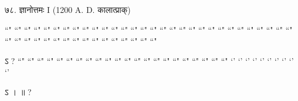 ७८. ज्ञानोत्तमः I (1200 A. D. कालात्प्राक्‌)

 ``" ``" ``" ``" ``" ``" ``" ``" ``" ``" ``" ``" ``" ``" ``" ``" ``" ``" ``" ``" ``" ``" ``" ``" ``" ``" ``" ``" ``" ``" ``" ``" ``" ``" ``" ``" ``" ``" ``" ``" ``" ``" ``" ``" ``" ``"

ऽ  ?
``" ``" ``" ``" ``" ``" ``" ``" ``" ``" ``" ``" ``" ``" ``" ``" ``" ``" ``" ``" ``" ``"
`' `' `' `' `' `' `' `' `' `' 

ऽ  ।   ॥ ?

